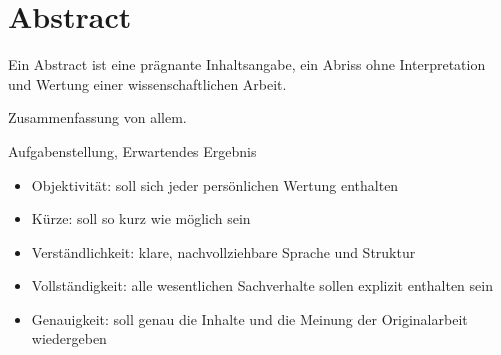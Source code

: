 \section{Abstract}

Ein Abstract ist eine prägnante Inhaltsangabe, ein Abriss ohne Interpretation und Wertung einer wissenschaftlichen Arbeit.

Zusammenfassung von allem.

Aufgabenstellung, Erwartendes Ergebnis
\begin{itemize}
\item Objektivität: soll sich jeder persönlichen Wertung enthalten
\item Kürze: soll so kurz wie möglich sein
\item Verständlichkeit: klare, nachvollziehbare Sprache und Struktur
\item Vollständigkeit: alle wesentlichen Sachverhalte sollen explizit enthalten sein
\item Genauigkeit: soll genau die Inhalte und die Meinung der Originalarbeit wiedergeben
\end{itemize}
